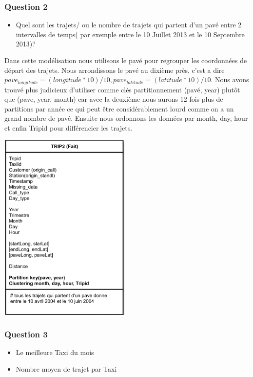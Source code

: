 \documentclass[]{report}
\begin{document}
	
	\subsubsection{Question 2}
	\begin{itemize}
		\item Quel sont les trajets/ ou le nombre de trajets qui partent d'un pavé entre 2 intervalles de temps( par exemple entre le 10 Juillet 2013 et le 10 Septembre 2013)?
	\end{itemize}
	Dans cette modélisation nous utilisons le pavé pour regrouper les coordonnées de départ des trajets. Nous arrondissons le pavé au dixième près, c'est a dire $pave_{longitude} = (longitude*10)/10, pave_{latitude} = (latitude*10)/10$. Nous avons trouvé plus judicieux d'utiliser comme clés partitionnement (pavé, year) plutôt que (pave, year, month) car avec la deuxième nous aurons 12 fois plus de partitions par année ce qui peut être considérablement lourd comme on a un grand nombre de pavé. Ensuite nous ordonnons les données par month, day, hour et enfin Tripid pour différencier les trajets. 
	
	
	\begin{center}
		\includegraphics[width=65mm]{Figures/Trip2.png}
		\label{fig:y=6}
	\end{center}
	\subsubsection{Question 3}
	\begin{itemize}
		\item Le meilleure Taxi du mois 
		\item  Nombre moyen de trajet par Taxi
	\end{itemize}
	
\end{document}
